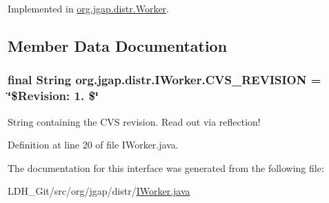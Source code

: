 Implemented in \hyperlink{classorg_1_1jgap_1_1distr_1_1_worker_a7ecb6526e7b056129e7f4f8a584865de}{org.\-jgap.\-distr.\-Worker}.



\subsection{Member Data Documentation}
\hypertarget{interfaceorg_1_1jgap_1_1distr_1_1_i_worker_a2ddf8b5817a607028d9bbb93e282fc49}{
\subsubsection[{C\-V\-S\-\_\-\-R\-E\-V\-I\-S\-I\-O\-N}]{\setlength{\rightskip}{0pt plus 5cm}final String org.\-jgap.\-distr.\-I\-Worker.\-C\-V\-S\-\_\-\-R\-E\-V\-I\-S\-I\-O\-N = \char`\"{}\$Revision\-: 1. \$\char`\"{}\hspace{0.3cm}{\ttfamily [static]}}}\label{interfaceorg_1_1jgap_1_1distr_1_1_i_worker_a2ddf8b5817a607028d9bbb93e282fc49}
String containing the C\-V\-S revision. Read out via reflection! 

Definition at line 20 of file I\-Worker.\-java.



The documentation for this interface was generated from the following file\-:\begin{DoxyCompactItemize}
\item 
L\-D\-H\-\_\-\-Git/src/org/jgap/distr/\hyperlink{_i_worker_8java}{I\-Worker.\-java}\end{DoxyCompactItemize}
